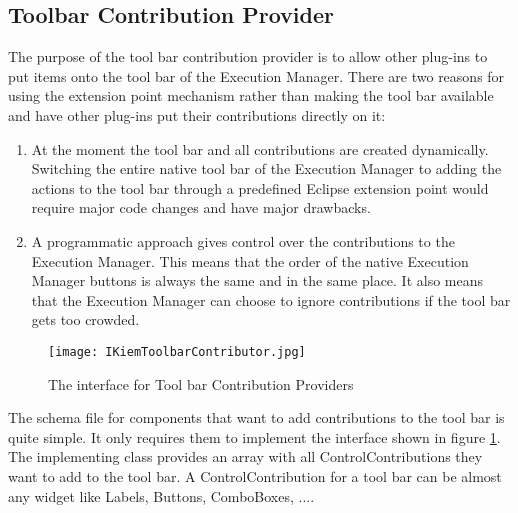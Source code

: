 \subsection{Toolbar Contribution Provider}
\label{section:ToolbarContributionProvider}
The purpose of the tool bar contribution provider is to allow other plug-ins to put
items onto the tool bar of the Execution Manager. 
There are two reasons for using the extension point mechanism
rather than making the tool bar available and have other plug-ins put their
contributions directly on it:
\begin{enumerate}
 \item At the moment the tool bar and all contributions are created dynamically. Switching
the entire native tool bar of the Execution Manager to adding the actions to the tool bar
through a predefined Eclipse extension point would require major code changes and
have major drawbacks.
 \item A programmatic approach gives control over the contributions to the Execution Manager.
This means that the order of the native Execution Manager buttons is always the same and in the
same place. It also means that the Execution Manager can choose to ignore contributions if the
tool bar gets too crowded.
\end{enumerate}
\begin{figure}[IToolbarContributor]
  \centering
  \texttt{[image: IKiemToolbarContributor.jpg]}
  \caption[The interface for Tool bar Contribution Providers]%
  {The interface for Tool bar Contribution Providers\protect}
  \label{fig:IToolbarContributor}
\end{figure}

The schema file for components that want to add contributions to the tool bar is quite simple.
It only requires them to implement the interface shown in figure \ref{fig:IToolbarContributor}.
The implementing class provides an array with all ControlContributions they want to add to the tool bar.
A ControlContribution for a tool bar can be almost any widget like Labels, Buttons, ComboBoxes, ....

